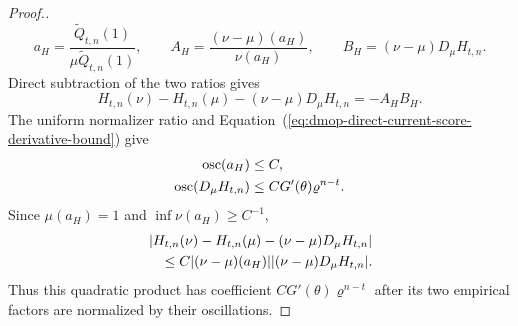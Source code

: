 \documentclass[11pt]{article}
\theoremstyle{thmstylethree}%
\begin{document}
\begin{proof}[Proof.]
\begin{equation}
a_H=\frac{\widetilde Q_{t,n}(1)}
{\mu\widetilde Q_{t,n}(1)},
\qquad
A_H=\frac{(\nu-\mu)(a_H)}{\nu(a_H)},
\qquad
B_H=(\nu-\mu)D_\mu H_{t,n}.
\end{equation}
Direct subtraction of the two ratios gives
\begin{equation}
H_{t,n}(\nu)-H_{t,n}(\mu)
-(\nu-\mu)D_\mu H_{t,n}
=-A_HB_H.
\label{eq:dmop-direct-current-predictor-exact-remainder}
\end{equation}
The uniform normalizer ratio and
Equation~(\ref{eq:dmop-direct-current-score-derivative-bound}) give
\begin{align}
\operatorname{osc}(a_H)&\leq C,                            \notag\\
\operatorname{osc}(D_\mu H_{t,n})
&\leq CG'(\theta)\varrho^{n-t}.
\end{align}
Since $\mu(a_H)=1$ and $\inf\nu(a_H)\geq C^{-1}$,
\begin{align}
&\left|
H_{t,n}(\nu)-H_{t,n}(\mu)
-(\nu-\mu)D_\mu H_{t,n}
\right|                                                     \notag\\
&\quad\leq
C|(\nu-\mu)(a_H)|
|(\nu-\mu)D_\mu H_{t,n}|.
\label{eq:dmop-direct-current-predictor-remainder-bound}
\end{align}
Thus this quadratic product has coefficient
$CG'(\theta)\varrho^{n-t}$ after its two empirical factors are normalized
by their oscillations.


\end{proof}
\end{document}
